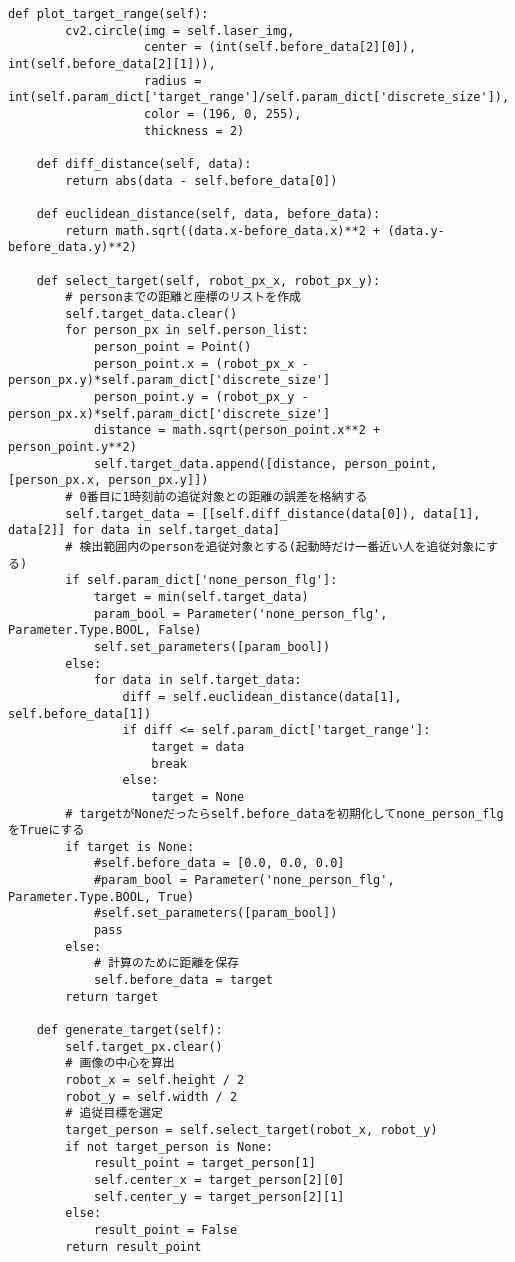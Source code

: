 \begin{lstlisting}[caption=person\_detector.py, label=person]
    def plot_target_range(self):
        cv2.circle(img = self.laser_img,
                   center = (int(self.before_data[2][0]), int(self.before_data[2][1])),
                   radius = int(self.param_dict['target_range']/self.param_dict['discrete_size']),
                   color = (196, 0, 255),
                   thickness = 2)

    def diff_distance(self, data):
        return abs(data - self.before_data[0])

    def euclidean_distance(self, data, before_data):
        return math.sqrt((data.x-before_data.x)**2 + (data.y-before_data.y)**2)

    def select_target(self, robot_px_x, robot_px_y):
        # personまでの距離と座標のリストを作成
        self.target_data.clear()
        for person_px in self.person_list:
            person_point = Point()
            person_point.x = (robot_px_x - person_px.y)*self.param_dict['discrete_size']
            person_point.y = (robot_px_y - person_px.x)*self.param_dict['discrete_size']
            distance = math.sqrt(person_point.x**2 + person_point.y**2)
            self.target_data.append([distance, person_point, [person_px.x, person_px.y]])
        # 0番目に1時刻前の追従対象との距離の誤差を格納する
        self.target_data = [[self.diff_distance(data[0]), data[1], data[2]] for data in self.target_data]
        # 検出範囲内のpersonを追従対象とする(起動時だけ一番近い人を追従対象にする)
        if self.param_dict['none_person_flg']:
            target = min(self.target_data)
            param_bool = Parameter('none_person_flg', Parameter.Type.BOOL, False)
            self.set_parameters([param_bool])
        else:
            for data in self.target_data:
                diff = self.euclidean_distance(data[1], self.before_data[1])
                if diff <= self.param_dict['target_range']:
                    target = data
                    break
                else:
                    target = None
        # targetがNoneだったらself.before_dataを初期化してnone_person_flgをTrueにする
        if target is None:
            #self.before_data = [0.0, 0.0, 0.0]
            #param_bool = Parameter('none_person_flg', Parameter.Type.BOOL, True)
            #self.set_parameters([param_bool])
            pass
        else:
            # 計算のために距離を保存
            self.before_data = target
        return target

    def generate_target(self):
        self.target_px.clear()
        # 画像の中心を算出
        robot_x = self.height / 2
        robot_y = self.width / 2
        # 追従目標を選定
        target_person = self.select_target(robot_x, robot_y)
        if not target_person is None:
            result_point = target_person[1]
            self.center_x = target_person[2][0]
            self.center_y = target_person[2][1]
        else:
            result_point = False
        return result_point



\end{lstlisting}
